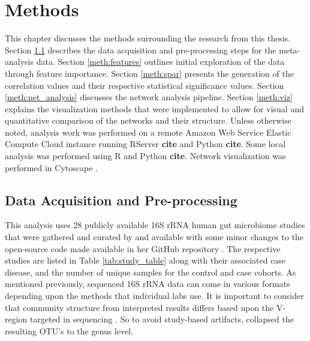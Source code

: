 
\chapter{Methods}\label{chap-meth}


This chapter discusses the methods surrounding the research from this thesis. Section \ref{sec:meth-avail} describes the data acquisition and pre-processing steps for the meta-analysis data. Section \ref{meth:features} outlines initial exploration of the data through feature importance. Section \ref{meth:spar} presents the generation of the correlation values and their respective statistical significance values. Section \ref{meth:net_analysis} discusses the network analysis pipeline. Section \ref{meth:viz} explains the visualization methods that were implemented to allow for visual and quantitative comparison of the networks and their structure. Unless otherwise noted, analysis work was performed on a remote Amazon Web Service Elastic Compute Cloud instance running RServer \textbf{cite} and Python \textbf{cite}. Some local analysis was performed using R and Python \textbf{cite}. Network visualization was performed in Cytoscape \citep{Shannon2003_cytoscape}.


\section{Data Acquisition and Pre-processing}\label{sec:meth-avail}
This analysis uses 28 publicly available 16S \acrshort{rRNA} human gut microbiome studies that were gathered and curated by \cite{Duvallet2017} and available with some minor changes to the open-source code made available in her GitHub repository \citep{Duvallet2018}. The respective studies are listed in Table \ref{tab:study_table} along with their associated case disease, and the number of unique samples for the control and case cohorts. As mentioned previously, sequenced 16S \acrshort{rRNA} data can come in various formats depending upon the methods that individual labs use. It is important to consider that community structure from interpreted results differs based upon the V-region targeted in sequencing \citep{Teng2018}. So to avoid study-based artifacts, \citeauthor{Duvallet2017} collapsed the resulting \acrshort{OTU}'s to the genus level. 

